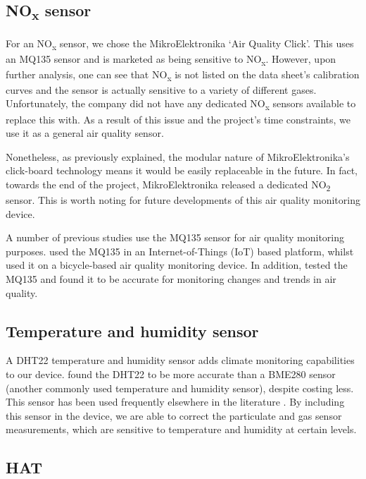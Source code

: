 \documentclass[11pt]{report}
\begin{document}
\subsection{NO\textsubscript{x} sensor}

For an NO\textsubscript{x} sensor, we chose the MikroElektronika `Air Quality Click'. This uses an MQ135 sensor and is marketed as being sensitive to NO\textsubscript{x}. However, upon further analysis, one can see that NO\textsubscript{x} is not listed on the data sheet's calibration curves and the sensor is actually sensitive to a variety of different gases. Unfortunately, the company did not have any dedicated NO\textsubscript{x} sensors available to replace this with. As a result of this issue and the project's time constraints, we use it as a general air quality sensor.

Nonetheless, as previously explained, the modular nature of MikroElektronika's click-board technology means it would be easily replaceable in the future. In fact, towards the end of the project, MikroElektronika released a dedicated NO\textsubscript{2} sensor. This is worth noting for future developments of this air quality monitoring device.

A number of previous studies use the MQ135 sensor for air quality monitoring purposes. \cite{Rahman2017adaptivesensingRPi} used the MQ135 in an Internet-of-Things (IoT) based platform, whilst \cite{anderson2012noxdroid} used it on a bicycle-based air quality monitoring device. In addition, \cite{garnier2017mythorreality} tested the MQ135 and found it to be accurate for monitoring changes and trends in air quality.

\subsection{Temperature and humidity sensor}

A DHT22 temperature and humidity sensor adds climate monitoring capabilities to our device. \cite{garnier2017mythorreality} found the DHT22 to be more accurate than a BME280 sensor (another commonly used temperature and humidity sensor), despite costing less. This sensor has been used frequently elsewhere in the literature \citep{Rahman2017adaptivesensingRPi, ibrahim2015IOTenvmon, alkandari2018airqualityexperimental}. By including this sensor in the device, we are able to correct the particulate and gas sensor measurements, which are sensitive to temperature and humidity at certain levels.

\subsection{HAT}
\end{document}
